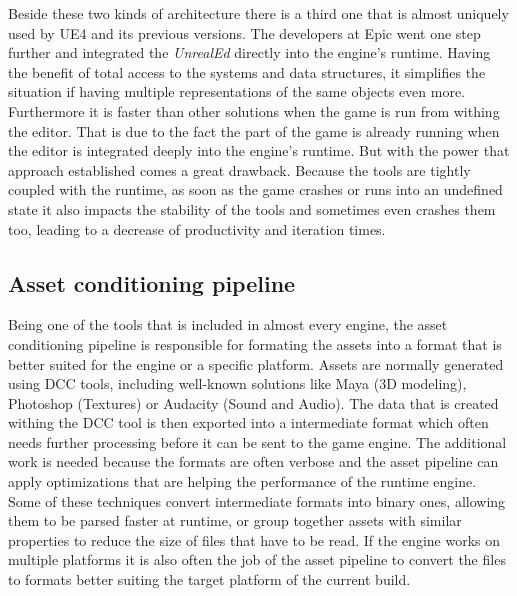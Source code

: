 \noindent 
Beside these two kinds of architecture there is a third one that is almost uniquely used by \ac{UE4} and its previous versions. The developers at Epic went one step further and integrated the \textit{UnrealEd} directly into the engine's runtime. Having the benefit of total access to the systems and data structures, it simplifies the situation if having multiple representations of the same objects even more. Furthermore it is faster than other solutions when the game is run from withing the editor. That is due to the fact the part of the game is already running when the editor is integrated deeply into the engine's runtime. But with the power that approach established comes a great drawback. Because the tools are tightly coupled with the runtime, as soon as the game crashes or runs into an undefined state it also impacts the stability of the tools and sometimes even crashes them too, leading to a decrease of productivity and iteration times.


\subsection{Asset conditioning pipeline}

Being one of the tools that is included in almost every engine, the asset conditioning pipeline is responsible for formating the assets into a format that is better suited for the engine or a specific platform. Assets are normally generated using \ac{DCC} tools, including well-known solutions like Maya (3D modeling), Photoshop (Textures) or Audacity (Sound and Audio). The data that is created withing the \ac{DCC} tool is then exported into a intermediate format which often needs further processing before it can be sent to the game engine. The additional work is needed because the formats are often verbose and the asset pipeline can apply optimizations that are helping the performance of the runtime engine. Some of these techniques convert intermediate formats into binary ones, allowing them to be parsed faster at runtime, or group together assets with similar properties to reduce the size of files that have to be read. If the engine works on multiple platforms it is also often the job of the asset pipeline to convert the files to formats better suiting the target platform of the current build. 
